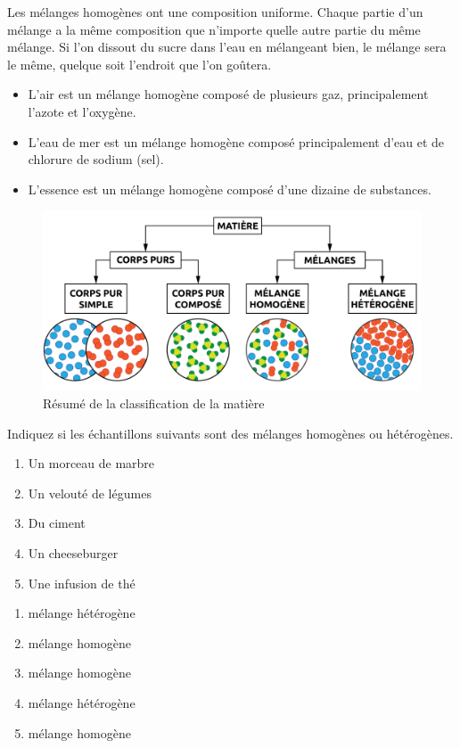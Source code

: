 \documentclass[
  11pt,
  french,
  a4paper,
  openany]{book}
\providecommand{\tightlist}{%
  \setlength{\itemsep}{0pt}\setlength{\parskip}{0pt}}
\begin{document}
Les mélanges homogènes ont une composition uniforme. Chaque partie d'un mélange a la même composition que n'importe quelle autre partie du même mélange. Si l'on dissout du sucre dans l'eau en mélangeant bien, le mélange sera le même, quelque soit l'endroit que l'on goûtera.

\begin{itemize}
\tightlist
\item
  L'air est un mélange homogène composé de plusieurs gaz, principalement l'azote et l'oxygène.
\item
  L'eau de mer est un mélange homogène composé principalement d'eau et de chlorure de sodium (sel).
\item
  L'essence est un mélange homogène composé d'une dizaine de substances.
\end{itemize}

\begin{figure}

{\centering \includegraphics[width=0.67\linewidth]{images/schema-matiere} 

}

\caption{Résumé de la classification de la matière}\label{fig:schema-matiere}
\end{figure}

\begin{Exercise}

Indiquez si les échantillons suivants sont des mélanges homogènes ou hétérogènes.

\begin{enumerate}
\def\labelenumi{\arabic{enumi}.}
\tightlist
\item
  Un morceau de marbre
\item
  Un velouté de légumes
\item
  Du ciment
\item
  Un cheeseburger
\item
  Une infusion de thé
\end{enumerate}


\end{Exercise}

\begin{Answer}

\begin{enumerate}
\def\labelenumi{\arabic{enumi}.}
\tightlist
\item
  mélange hétérogène
\item
  mélange homogène
\item
  mélange homogène
\item
  mélange hétérogène
\item
  mélange homogène
\end{enumerate}


\end{Answer}
\end{document}
